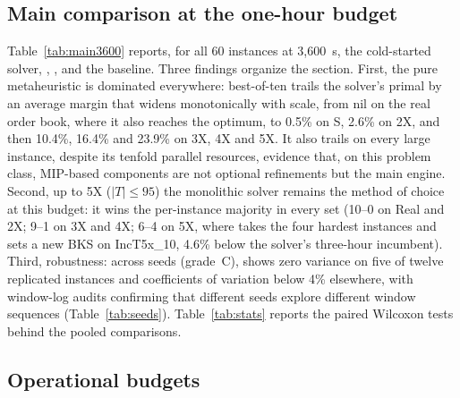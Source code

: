 \subsection{Main comparison at the one-hour budget}
\label{sec:main3600}

Table~\ref{tab:main3600} reports, for all 60 instances at
3{,}600~s, the cold-started solver, \RFFO{}, \RFMIP{}, and the
\ILS{} baseline. Three findings organize the section. First, the
pure metaheuristic is dominated everywhere: \ILS{} best-of-ten trails
the solver's primal by an average margin that widens monotonically
with scale, from nil on the real order book, where it also reaches
the optimum, to 0.5\% on S, 2.6\% on 2X, and then 10.4\%, 16.4\%
and 23.9\% on 3X, 4X and 5X. It also trails
\RFFO{} on every large instance, despite its tenfold parallel
resources, evidence that, on this problem class, MIP-based
components are not optional refinements but the main engine.
Second, up to 5X ($|T|\le 95$) the monolithic solver remains the
method of choice at this budget: it wins the per-instance majority
in every set (10--0 on Real and 2X; 9--1 on 3X and 4X; 6--4 on 5X,
where \RFFO{} takes the four hardest instances and sets a new BKS on
IncT5x\_10, 4.6\% below the solver's three-hour incumbent). Third,
robustness: across seeds (grade~C), \RFFO{} shows zero variance on
five of twelve replicated instances and coefficients of variation
below 4\% elsewhere, with window-log audits confirming that
different seeds explore different window sequences
(Table~\ref{tab:seeds}).
Table~\ref{tab:stats} reports the paired Wilcoxon tests behind the
pooled comparisons.





\subsection{Operational budgets}
\label{sec:short}

